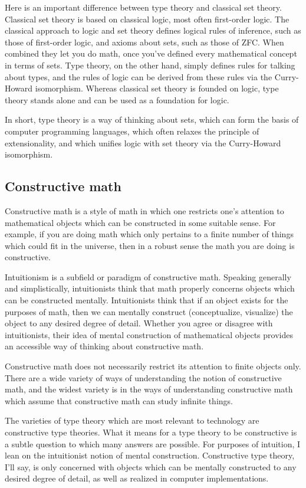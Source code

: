 \documentclass{article}
\begin{document}
Here is an important difference between type theory and classical set theory. Classical set theory is based on classical logic, most often first-order logic. The classical approach to logic and set theory defines logical rules of inference, such as those of first-order logic, and axioms about sets, such as those of ZFC. When combined they let you do math, once you've defined every mathematical concept in terms of sets. Type theory, on the other hand, simply defines rules for talking about types, and the rules of logic can be derived from these rules via the Curry-Howard isomorphism. Whereas classical set theory is founded on logic, type theory stands alone and can be used as a foundation for logic.

In short, type theory is a way of thinking about sets, which can form the basis of computer programming languages, which often relaxes the principle of extensionality, and which unifies logic with set theory via the Curry-Howard isomorphism.

\subsection{Constructive math}

Constructive math is a style of math in which one restricts one's attention to mathematical objects which can be constructed in some suitable sense. For example, if you are doing math which only pertains to a finite number of things which could fit in the universe, then in a robust sense the math you are doing is constructive.

Intuitionism is a subfield or paradigm of constructive math. Speaking generally and simplistically, intuitionists think that math properly concerns objects which can be constructed mentally. Intuitionists think that if an object exists for the purposes of math, then we can mentally construct (conceptualize, visualize) the object to any desired degree of detail. Whether you agree or disagree with intuitionists, their idea of mental construction of mathematical objects provides an accessible way of thinking about constructive math.

Constructive math does not necessarily restrict its attention to finite objects only. There are a wide variety of ways of understanding the notion of constructive math, and the widest variety is in the ways of understanding constructive math which assume that constructive math can study infinite things.

The varieties of type theory which are most relevant to technology are constructive type theories. What it means for a type theory to be constructive is a subtle question to which many answers are possible. For purposes of intuition, I lean on the intuitionist notion of mental construction. Constructive type theory, I'll say, is only concerned with objects which can be mentally constructed to any desired degree of detail, as well as realized in computer implementations.
\end{document}
